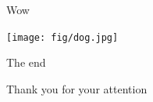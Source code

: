 \documentclass[8pt, aspectratio=169]{beamer}
\begin{document}
\begin{frame}{Wow}
\begin{center}
\vspace*{\fill}

\texttt{[image: fig/dog.jpg]}

\vspace*{\fill}
\end{center}
\end{frame}

\begin{frame}{The end}
\begin{center}
\vspace*{\fill}

\Huge Thank you for your attention

\vspace*{\fill}
\end{center}
\end{frame}

\end{document}
